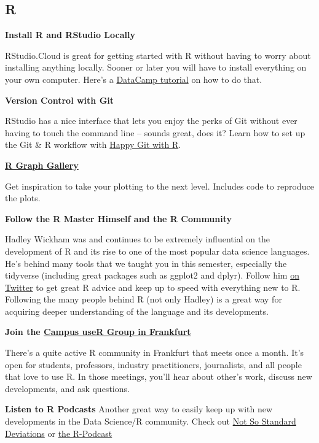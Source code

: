 \documentclass[
  11pt,
]{article}
\newenvironment{tips}[1]
  {
  \begin{itemize}
  \footnotesize
  \renewcommand{\labelitemi}{
    \raisebox{-.7\height}[0pt][0pt]{
      {\setkeys{Gin}{width=3em,keepaspectratio}
        \texttt{[image: images/\#1.png]}}
    }
  }
  \setlength{\fboxsep}{1em}
  \begin{rbox}
  \item
  }
  {
  \end{rbox}
  \end{itemize}
  }
\begin{document}
\hypertarget{r}{%
\subsection{R}\label{r}}

\begin{tips}r
\textbf{Install R and RStudio Locally}

RStudio.Cloud is great for getting started with R without having to worry about installing anything locally. Sooner or later you will have to install everything on your own computer. Here's a \href{https://www.datacamp.com/community/tutorials/installing-R-windows-mac-ubuntu}{DataCamp tutorial} on how to do that.

\textbf{Version Control with Git}

RStudio has a nice interface that lets you enjoy the perks of Git without ever having to touch the command line -- sounds great, does it? Learn how to set up the Git \& R workflow with \href{https://happygitwithr.com/}{Happy Git with R}.

\textbf{\href{https://www.r-graph-gallery.com/}{R Graph Gallery}}

Get inspiration to take your plotting to the next level. Includes code to reproduce the plots.

\textbf{Follow the R Master Himself and the R Community}

Hadley Wickham was and continues to be extremely influential on the development of R and its rise to one of the most popular data science languages. He's behind many tools that we taught you in this semester, especially the tidyverse (including great packages such as ggplot2 and dplyr). Follow him \href{https://twitter.com/hadleywickham}{on Twitter} to get great R advice and keep up to speed with everything new to R. Following the many people behind R (not only Hadley) is a great way for acquiring deeper understanding of the language and its developments.

\textbf{Join the \href{https://www.meetup.com/r-frankfurt/}{Campus useR Group in Frankfurt}}

There's a quite active R community in Frankfurt that meets once a month. It's open for students, professors, industry practitioners, journalists, and all people that love to use R. In those meetings, you'll hear about other's work, discuss new developments, and ask questions.

\textbf{Listen to R Podcasts}
Another great way to easily keep up with new developments in the Data Science/R community. Check out
\href{http://nssdeviations.com/}{Not So Standard Deviations} or \href{https://r-podcast.org/}{the R-Podcast}

\end{tips}
\end{document}
